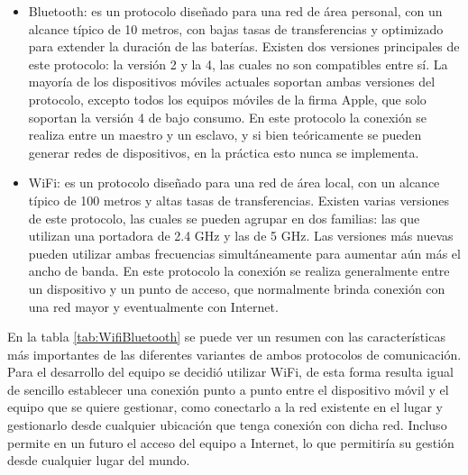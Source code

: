 \begin{itemize}
	\item Bluetooth: es un protocolo diseñado para una red de área personal, con un alcance típico de 10 metros, con bajas tasas de transferencias y optimizado para extender la duración de las baterías. Existen dos versiones principales de este protocolo: la versión 2 y la 4, las cuales no son compatibles entre sí. La mayoría de los dispositivos móviles actuales soportan ambas versiones del protocolo, excepto todos los equipos móviles de la firma Apple, que solo soportan la versión 4 de bajo consumo. En este protocolo la conexión se realiza entre un maestro y un esclavo, y si bien teóricamente se pueden generar redes de dispositivos, en la práctica esto nunca se implementa.
	
	\item WiFi: es un protocolo diseñado para una red de área local, con un alcance típico de 100 metros y altas tasas de transferencias. Existen varias versiones de este protocolo, las cuales se pueden agrupar en dos familias: las que utilizan una portadora de 2.4 GHz y las de 5 GHz. Las versiones más nuevas pueden utilizar ambas frecuencias simultáneamente para aumentar aún más el ancho de banda. En este protocolo la conexión se realiza generalmente entre un dispositivo y un punto de acceso, que normalmente brinda conexión con una red mayor y eventualmente con Internet.
\end{itemize}

En la tabla \ref{tab:WifiBluetooth} se puede ver un resumen con las características más importantes de las diferentes variantes de ambos protocolos de comunicación. Para el desarrollo del equipo se decidió utilizar WiFi, de esta forma resulta igual de sencillo establecer una conexión punto a punto entre el dispositivo móvil y el equipo que se quiere gestionar, como conectarlo a la red existente en el lugar y gestionarlo desde cualquier ubicación que tenga conexión con dicha red. Incluso permite en un futuro el acceso del equipo a Internet, lo que permitiría su gestión desde cualquier lugar del mundo.

